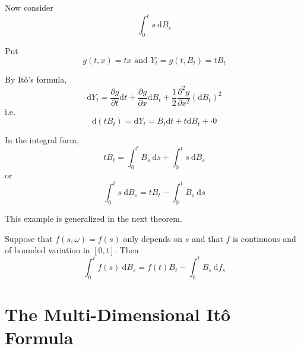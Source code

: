\begin{example}
    Now consider
    \[
        \int_0^t s ~\mathrm{d}B_s
    \]

    Put
    \[
        g(t,x) = tx \text{ and } Y_t = g(t,B_t) = tB_t
    \]

    By Itô's formula,
    \[
        \mathrm{d}Y_t = \frac{\partial g}{\partial t} \mathrm{d}t + \frac{\partial g}{\partial x} \mathrm{d}B_t + \frac{1}{2}\frac{\partial^2 g}{\partial x^2} (\mathrm{d}B_t)^2 
    \]
    i.e.
    \[
        \mathrm{d}(tB_t) = \mathrm{d}Y_t = B_t \mathrm{d}t + t \mathrm{d}B_t +  \cdot 0
    \]

    In the integral form,
    \[
        tB_t = \int_0^t B_s ~\mathrm{d}s + \int_0^t s ~\mathrm{d}B_s
    \]
    or
    \[
        \int_0^t s ~\mathrm{d}B_s = tB_t - \int_0^t B_s ~\mathrm{d}s
    \]
\end{example}

This example is generalized in the next theorem.

\begin{theorem}
    Suppose that $f(s, \omega) = f(s)$ only depends on $s$ and that $f$ is continuous and of bounded variation in $[0,t]$. Then 
    \begin{equation*}
        \int_0^t f(s) ~\mathrm{d}B_s = f(t) B_t - \int_0^t B_s ~\mathrm{d}f_s
    \end{equation*}
\end{theorem}

\section{The Multi-Dimensional Itô Formula}

